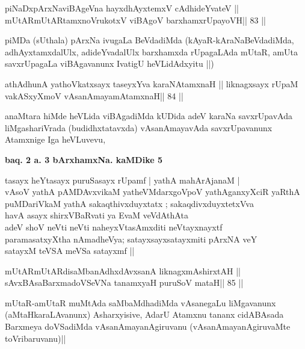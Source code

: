\begin{shl}
piNaDxpArxNaviBAgeVna hayxdhAyxtemxV cAdhideYvateV ||
mUtARmUtARtamxnoVrukotxV viBAgoV barxhamxrUpayoVH\hfill || 83 ||
\end{shl}

\begin{artha}
piMDa (sUthala) pArxNa ivugaLa BeVdadiMda (kAyaR-kAraNaBeVdadiMda,
adhAyxtamxdalUlx, adideYvadalUlx barxhamxda rUpagaLAda mUtaR, amUta
savxrUpagaLa viBAgavanunx IvatigU heVLidAdxyitu ||)
\end{artha}

\begin{shl}
athAdhunA yathoVkatxsayx taseyxYva karaNAtamxnaH ||
liknagxsayx rUpaM vakASxyXmoV vAsanAmayamAtamxnaH\hfill || 84 ||
\end{shl}

\begin{artha}
anaMtara hiMde heVLida viBAgadiMda kUDida adeV karaNa savxrUpavAda
liMgashariVrada (budidhxtatavxda) vAsanAmayavAda savxrUpavanunx
Atamxnige Iga heVLuvevu,
\end{artha}

\begin{center}
\textbf{baq. 2 a. 3 bArxhamxNa. kaMDike 5}
\end{center}

\begin{shl}
tasayx heYtasayx puruSasayx rUpamf | yathA mahArAjanaM |\\
vAsoV yathA pAMDAvxvikaM yatheVMdarxgoVpoV yathAganxyXciR yaRthA\\
puMDariVkaM yathA sakaqthivxduyxtatx ; sakaqdivxduyxtetxVva\\
havA asayx shirxVBaRvati ya EvaM veVdAthAta\\
adeV shoV neVti neVti naheyxVtasAmxditi neVtayxnayxtf \\
paramasatxyXtha nAmadheVya; satayxsayxsatayxmiti pArxNA veY\\
satayxM teVSA meVSa satayxmf ||
\end{shl}

\begin{shl}
mUtARmUtARdisaMbanAdhxdAvxsanA liknagxmAshirxtAH ||
sAvxBAsaBarxmadoVSeVNa tanamxyaH puruSoV mataH\hfill || 85 ||
\end{shl}

\begin{artha}
mUtaR-amUtaR muMtAda saMbaMdhadiMda vAsanegaLu liMgavanunx
(aMtaHkaraLAvanunx) Asharxyisive, AdarU Atamxnu tananx cidABAsada
Barxmeya doVSadiMda vAsanAmayanAgiruvanu (vAsanAmayanAgiruvaMte toVribaruvanu)|| 
\end{artha}

